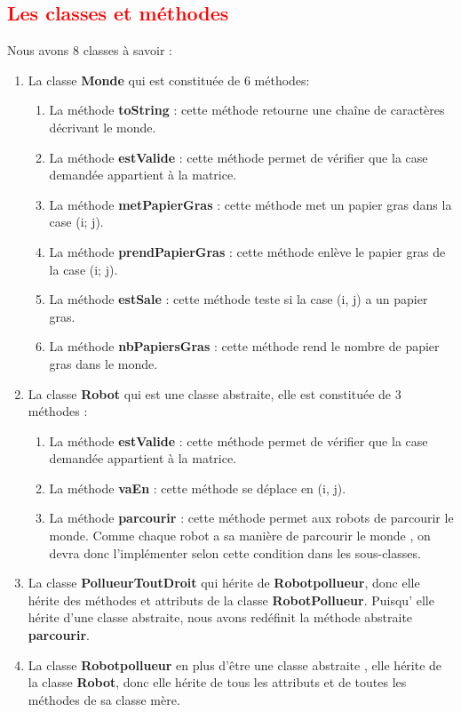 \documentclass{article}
\begin{document}
	 
	\textcolor{red}{\section*{Les classes et méthodes}}
	Nous avons 8 classes à savoir :
	\begin{enumerate}
		\item La classe \textbf{Monde} qui est constituée de 6 méthodes:
		\begin{enumerate}
			\item La méthode \textbf{toString} : cette méthode retourne une chaîne de caractères décrivant le monde.
			\item La méthode \textbf{estValide} : cette méthode permet de vérifier que la case demandée appartient à la matrice.
			\item La méthode \textbf{metPapierGras} : cette méthode met un papier gras dans la case (i; j).
			\item La méthode \textbf{prendPapierGras} : cette méthode enlève le papier gras de la case (i; j).
			\item La méthode \textbf{estSale} : cette méthode teste si la case (i, j) a un papier gras.
			\item La méthode \textbf{nbPapiersGras} : cette méthode rend le nombre de papier gras dans le monde.
		\end{enumerate}
		\item La classe \textbf{Robot} qui est une classe abstraite, elle est constituée de 3 méthodes :
		\begin{enumerate}
			\item La méthode \textbf{estValide} : cette méthode permet de vérifier que la case demandée appartient à la matrice.
			\item La méthode \textbf{vaEn} : cette méthode se déplace en (i, j).
			\item La méthode \textbf{parcourir} : cette méthode permet aux robots de parcourir le monde. 
			Comme chaque robot a sa manière de parcourir le monde , on devra donc l'implémenter selon cette condition dans les sous-classes.
		\end{enumerate}
		\item La classe \textbf{PollueurToutDroit} qui hérite de \textbf{Robotpollueur}, donc elle hérite des méthodes et attributs de la classe \textbf{RobotPollueur}. Puisqu' elle hérite d'une classe abstraite, nous avons redéfinit la méthode abstraite \textbf{parcourir}.
		\item La classe \textbf{Robotpollueur} en plus d'être une classe abstraite , elle hérite de la classe \textbf{Robot}, donc elle hérite de tous les attributs et de toutes les méthodes de sa classe mère.

\end{enumerate}
\end{document}
